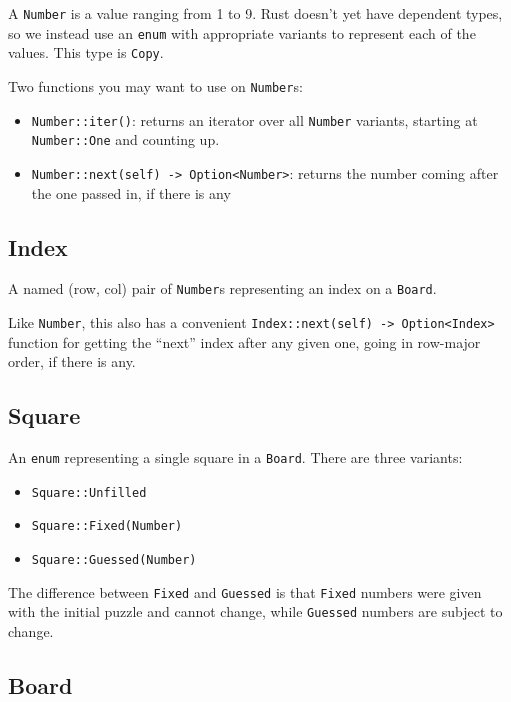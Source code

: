 \documentclass{article}
\begin{document}
A \texttt{Number} is a value ranging from 1 to 9. Rust doesn't yet have dependent types, so we instead use an \texttt{enum} with appropriate variants to represent each of the values. This type is \texttt{Copy}.

Two functions you may want to use on \texttt{Number}s:
\begin{itemize}
    \item \texttt{Number::iter()}: returns an iterator over all \texttt{Number} variants, starting at \texttt{Number::One} and counting up.
    \item \texttt{Number::next(self) -> Option<Number>}: returns the number coming after the one passed in, if there is any
\end{itemize}

\subsection*{Index}

A named (row, col) pair of \texttt{Number}s representing an index on a \texttt{Board}.

Like \texttt{Number}, this also has a convenient \texttt{Index::next(self) -> Option<Index>} function for getting the ``next'' index after any given one, going in row-major order, if there is any.

\subsection*{Square}

An \texttt{enum} representing a single square in a \texttt{Board}. There are three variants:
\begin{itemize}
    \item \texttt{Square::Unfilled}
    \item \texttt{Square::Fixed(Number)}
    \item \texttt{Square::Guessed(Number)}
\end{itemize}
The difference between \texttt{Fixed} and \texttt{Guessed} is that \texttt{Fixed} numbers were given with the initial puzzle and cannot change, while \texttt{Guessed} numbers are subject to change.

\subsection*{Board}
\end{document}
